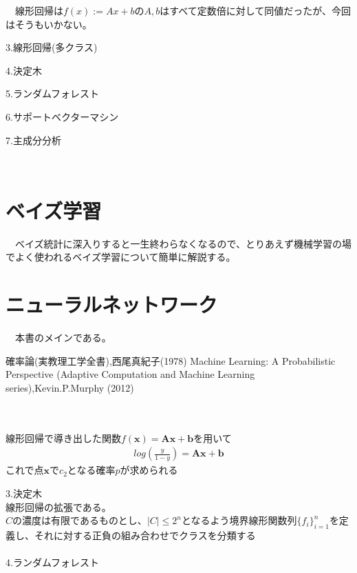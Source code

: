 \documentclass{jsarticle}
\begin{document}
　線形回帰は$f(x):=Ax+b$の$A,b$はすべて定数倍に対して同値だったが、今回はそうもいかない。

3.線形回帰(多クラス)

4.決定木

5.ランダムフォレスト

6.サポートベクターマシン

7.主成分分析


\newpage
\scalebox{1.1}{3.実装について}\\
\newpage
\section{ベイズ学習}
　ベイズ統計に深入りすると一生終わらなくなるので、とりあえず機械学習の場でよく使われるベイズ学習について簡単に解説する。\\

\newpage
\section{ニューラルネットワーク}
　本書のメインである。



\newpage
\begin{thebibliography}{99}
   確率論(実教理工学全書),西尾真紀子(1978)
   Machine Learning: A Probabilistic Perspective (Adaptive Computation and Machine Learning series),Kevin.P.Murphy (2012)

\end{thebibliography}



\newpage

　\\

　\\

線形回帰で導き出した関数$f(\bm{x})=\bm{A}\bm{x}+\bm{b}$を用いて
\begin{eqnarray}
log(\frac{y}{1-y})=\bm{A}\bm{x}+\bm{b}
\end{eqnarray}
これで点$\bm{x}$で$c_2$となる確率$p$が求められる

3.決定木\\
線形回帰の拡張である。\\
$C$の濃度は有限であるものとし、$|C|\leq 2^n$となるよう境界線形関数列$\{f_i\}_{i=1}^n$を定義し、それに対する正負の組み合わせでクラスを分類する\\
　\\
4.ランダムフォレスト\\
\end{document}

